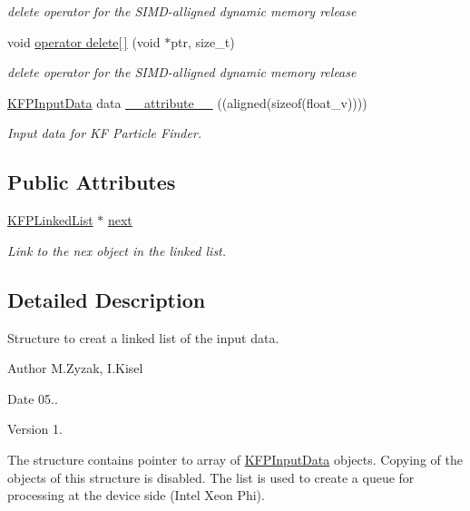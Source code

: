 \begin{DoxyCompactItemize}
\begin{DoxyCompactList}\small\item\em delete operator for the S\+I\+M\+D-\/alligned dynamic memory release \end{DoxyCompactList}\item 
void \hyperlink{structKFPLinkedList_ac22d49d82fbc8d45d2a01da5e55de6f1}{operator delete\mbox{[}$\,$\mbox{]}} (void $\ast$ptr, size\+\_\+t)\hypertarget{structKFPLinkedList_ac22d49d82fbc8d45d2a01da5e55de6f1}{}\label{structKFPLinkedList_ac22d49d82fbc8d45d2a01da5e55de6f1}

\begin{DoxyCompactList}\small\item\em delete operator for the S\+I\+M\+D-\/alligned dynamic memory release \end{DoxyCompactList}\item 
\hyperlink{classKFPInputData}{K\+F\+P\+Input\+Data} data \hyperlink{structKFPLinkedList_a0dcd70e475be19f41a205412301bdaf1}{\+\_\+\+\_\+attribute\+\_\+\+\_\+} ((aligned(sizeof(float\+\_\+v))))
\begin{DoxyCompactList}\small\item\em Input data for KF Particle Finder. \end{DoxyCompactList}\end{DoxyCompactItemize}
\subsection*{Public Attributes}
\begin{DoxyCompactItemize}
\item 
\hyperlink{structKFPLinkedList}{K\+F\+P\+Linked\+List} $\ast$ \hyperlink{structKFPLinkedList_aa528c23983df4be726b9b0cfd6e76d82}{next}\hypertarget{structKFPLinkedList_aa528c23983df4be726b9b0cfd6e76d82}{}\label{structKFPLinkedList_aa528c23983df4be726b9b0cfd6e76d82}

\begin{DoxyCompactList}\small\item\em Link to the nex object in the linked list. \end{DoxyCompactList}\end{DoxyCompactItemize}


\subsection{Detailed Description}
Structure to creat a linked list of the input data. 

\begin{DoxyAuthor}{Author}
M.\+Zyzak, I.\+Kisel 
\end{DoxyAuthor}
\begin{DoxyDate}{Date}
05.. 
\end{DoxyDate}
\begin{DoxyVersion}{Version}
1.
\end{DoxyVersion}
The structure contains pointer to array of \hyperlink{classKFPInputData}{K\+F\+P\+Input\+Data} objects. Copying of the objects of this structure is disabled. The list is used to create a queue for processing at the device side (Intel Xeon Phi). 

